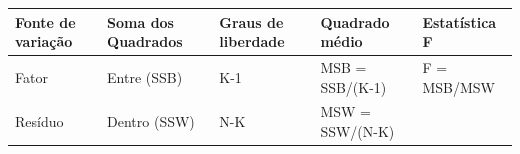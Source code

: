 \documentclass[
]{book}
\begin{document}
\begin{longtable}[]{@{}lllll@{}}
\toprule
\begin{minipage}[b]{0.17\columnwidth}\raggedright
Fonte de variação\strut
\end{minipage} & \begin{minipage}[b]{0.17\columnwidth}\raggedright
Soma dos Quadrados\strut
\end{minipage} & \begin{minipage}[b]{0.17\columnwidth}\raggedright
Graus de liberdade\strut
\end{minipage} & \begin{minipage}[b]{0.17\columnwidth}\raggedright
Quadrado médio\strut
\end{minipage} & \begin{minipage}[b]{0.17\columnwidth}\raggedright
Estatística F\strut
\end{minipage}\tabularnewline
\midrule
\endhead
\begin{minipage}[t]{0.17\columnwidth}\raggedright
Fator\strut
\end{minipage} & \begin{minipage}[t]{0.17\columnwidth}\raggedright
Entre (SSB)\strut
\end{minipage} & \begin{minipage}[t]{0.17\columnwidth}\raggedright
K-1\strut
\end{minipage} & \begin{minipage}[t]{0.17\columnwidth}\raggedright
MSB = SSB/(K-1)\strut
\end{minipage} & \begin{minipage}[t]{0.17\columnwidth}\raggedright
F = MSB/MSW\strut
\end{minipage}\tabularnewline
\begin{minipage}[t]{0.17\columnwidth}\raggedright
Resíduo\strut
\end{minipage} & \begin{minipage}[t]{0.17\columnwidth}\raggedright
Dentro (SSW)\strut
\end{minipage} & \begin{minipage}[t]{0.17\columnwidth}\raggedright
N-K\strut
\end{minipage} & \begin{minipage}[t]{0.17\columnwidth}\raggedright
MSW = SSW/(N-K)\strut
\end{minipage} & \begin{minipage}[t]{0.17\columnwidth}\raggedright
\strut
\end{minipage}\tabularnewline

\end{longtable}
\end{document}

